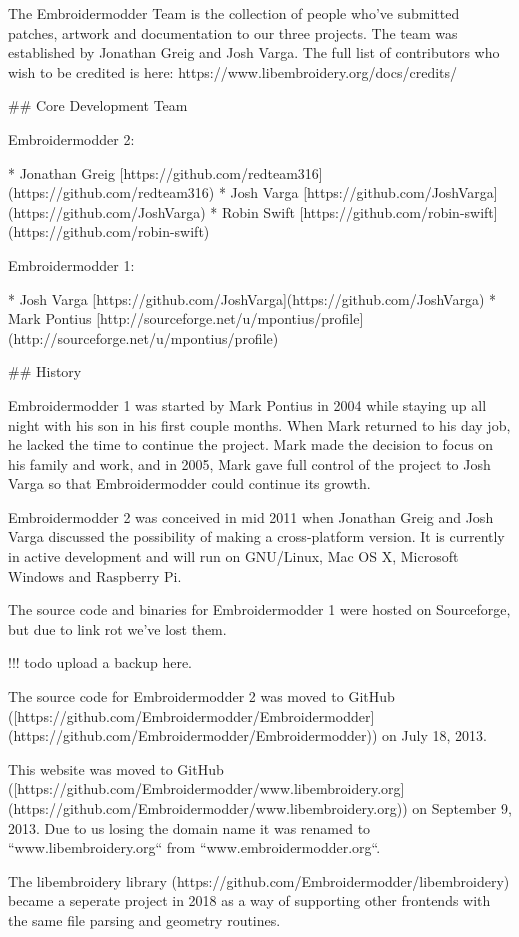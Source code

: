 The Embroidermodder Team is the collection of people who've submitted
patches, artwork and documentation to our three projects.
The team was established by Jonathan Greig and Josh Varga.
The full list of contributors who wish to be credited is
here: https://www.libembroidery.org/docs/credits/

## Core Development Team

Embroidermodder 2:

  * Jonathan Greig [https://github.com/redteam316](https://github.com/redteam316)
  * Josh Varga [https://github.com/JoshVarga](https://github.com/JoshVarga)
  * Robin Swift [https://github.com/robin-swift](https://github.com/robin-swift)

Embroidermodder 1:

  * Josh Varga [https://github.com/JoshVarga](https://github.com/JoshVarga)
  * Mark Pontius [http://sourceforge.net/u/mpontius/profile](http://sourceforge.net/u/mpontius/profile)

## History

Embroidermodder 1 was started by Mark Pontius in 2004 while staying up all night
with his son in his first couple months. When Mark returned to his day job,
he lacked the time to continue the project. Mark made the decision to focus on his
family and work, and in 2005, Mark gave full control of the project to Josh Varga
so that Embroidermodder could continue its growth.

Embroidermodder 2 was conceived in mid 2011 when Jonathan Greig and Josh Varga
discussed the possibility of making a cross-platform version. It is currently in
active development and will run on GNU/Linux, Mac OS X, Microsoft Windows and Raspberry Pi.

The source code and binaries for Embroidermodder 1 were hosted on Sourceforge, but
due to link rot we've lost them.

!!! todo
    upload a backup here.

The source code for Embroidermodder
2 was moved to GitHub ([https://github.com/Embroidermodder/Embroidermodder](https://github.com/Embroidermodder/Embroidermodder)) on July 18, 2013.

This website was moved to
GitHub ([https://github.com/Embroidermodder/www.libembroidery.org](https://github.com/Embroidermodder/www.libembroidery.org)) on September 9, 2013. Due to us losing the domain name it was renamed to
``www.libembroidery.org`` from ``www.embroidermodder.org``.

The libembroidery library (https://github.com/Embroidermodder/libembroidery)
became a seperate project in 2018 as a way of supporting other frontends with the
same file parsing and geometry routines.

